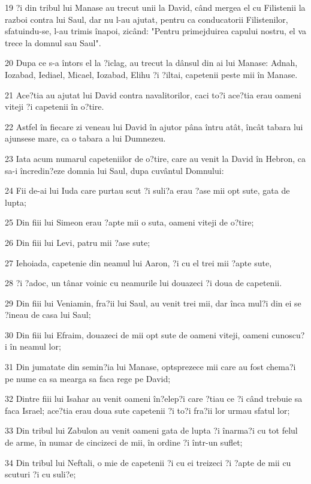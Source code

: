 \par 19 ?i din tribul lui Manase au trecut unii la David, când mergea el cu Filistenii la razboi contra lui Saul, dar nu l-au ajutat, pentru ca conducatorii Filistenilor, sfatuindu-se, l-au trimis înapoi, zicând: "Pentru primejduirea capului nostru, el va trece la domnul sau Saul".
\par 20 Dupa ce s-a întors el la ?iclag, au trecut la dânsul din ai lui Manase: Adnah, Iozabad, Iediael, Micael, Iozabad, Elihu ?i ?iltai, capetenii peste mii în Manase.
\par 21 Ace?tia au ajutat lui David contra navalitorilor, caci to?i ace?tia erau oameni viteji ?i capetenii în o?tire.
\par 22 Astfel în fiecare zi veneau lui David în ajutor pâna întru atât, încât tabara lui ajunsese mare, ca o tabara a lui Dumnezeu.
\par 23 Iata acum numarul capeteniilor de o?tire, care au venit la David în Hebron, ca sa-i încredin?eze domnia lui Saul, dupa cuvântul Domnului:
\par 24 Fii de-ai lui Iuda care purtau scut ?i suli?a erau ?ase mii opt sute, gata de lupta;
\par 25 Din fiii lui Simeon erau ?apte mii o suta, oameni viteji de o?tire;
\par 26 Din fiii lui Levi, patru mii ?ase sute;
\par 27 Iehoiada, capetenie din neamul lui Aaron, ?i cu el trei mii ?apte sute,
\par 28 ?i ?adoc, un tânar voinic cu neamurile lui douazeci ?i doua de capetenii.
\par 29 Din fiii lui Veniamin, fra?ii lui Saul, au venit trei mii, dar înca mul?i din ei se ?ineau de casa lui Saul;
\par 30 Din fiii lui Efraim, douazeci de mii opt sute de oameni viteji, oameni cunoscu?i în neamul lor;
\par 31 Din jumatate din semin?ia lui Manase, optsprezece mii care au fost chema?i pe nume ca sa mearga sa faca rege pe David;
\par 32 Dintre fiii lui Isahar au venit oameni în?elep?i care ?tiau ce ?i când trebuie sa faca Israel; ace?tia erau doua sute capetenii ?i to?i fra?ii lor urmau sfatul lor;
\par 33 Din tribul lui Zabulon au venit oameni gata de lupta ?i înarma?i cu tot felul de arme, în numar de cincizeci de mii, în ordine ?i într-un suflet;
\par 34 Din tribul lui Neftali, o mie de capetenii ?i cu ei treizeci ?i ?apte de mii cu scuturi ?i cu suli?e;
